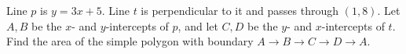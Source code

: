 Line $p$ is $y=3x+5$. Line $t$ is perpendicular to it and passes through $(1,8)$. Let $A,B$ be the $x$- and $y$-intercepts of $p$, and let $C,D$ be the $y$- and $x$-intercepts of $t$. Find the area of the simple polygon with boundary $A\to B\to C\to D\to A$.
